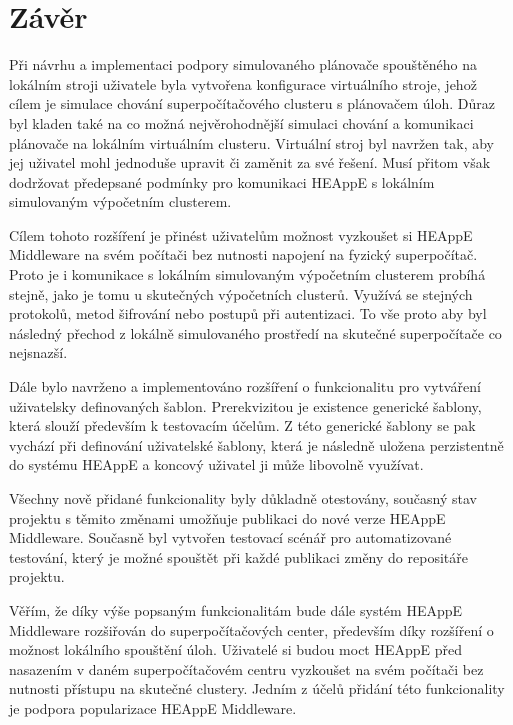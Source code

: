 \chapter{Závěr}
Při návrhu a implementaci podpory simulovaného plánovače spouštěného na lokálním stroji uživatele byla vytvořena konfigurace virtuálního stroje, jehož cílem je simulace chování superpočítačového clusteru s plánovačem úloh. Důraz byl kladen také na co možná nejvěrohodnější simulaci chování a komunikaci plánovače na lokálním virtuálním clusteru. Virtuální stroj byl navržen tak, aby jej uživatel mohl jednoduše upravit či zaměnit za své řešení. Musí přitom však dodržovat předepsané podmínky pro komunikaci HEAppE s lokálním simulovaným výpočetním clusterem.

Cílem tohoto rozšíření je přinést uživatelům možnost vyzkoušet si HEAppE Middleware na svém počítači bez nutnosti napojení na fyzický superpočítač. Proto je i komunikace s lokálním simulovaným výpočetním clusterem probíhá stejně, jako je tomu u skutečných výpočetních clusterů. Využívá se stejných protokolů, metod šifrování nebo postupů při autentizaci. To vše proto aby byl následný přechod z lokálně simulovaného prostředí na skutečné superpočítače co nejsnazší.

Dále bylo navrženo a implementováno rozšíření o funkcionalitu pro vytváření uživatelsky definovaných šablon. Prerekvizitou je existence generické šablony, která slouží především k testovacím účelům. Z této generické šablony se pak vychází při definování uživatelské šablony, která je následně uložena perzistentně do systému HEAppE a koncový uživatel ji může libovolně využívat.

Všechny nově přidané funkcionality byly důkladně otestovány, současný stav projektu s těmito změnami umožňuje publikaci do nové verze HEAppE Middleware. Současně byl vytvořen testovací scénář pro automatizované testování, který je možné spouštět při každé publikaci změny do repositáře projektu.

Věřím, že díky výše popsaným funkcionalitám bude dále systém HEAppE Middleware rozšiřován do superpočítačových center, především díky rozšíření o možnost lokálního spouštění úloh. Uživatelé si budou moct HEAppE před nasazením v daném superpočítačovém centru vyzkoušet na svém počítači bez nutnosti přístupu na skutečné clustery. Jedním z účelů přidání této funkcionality je podpora popularizace HEAppE Middleware.
\endinput
